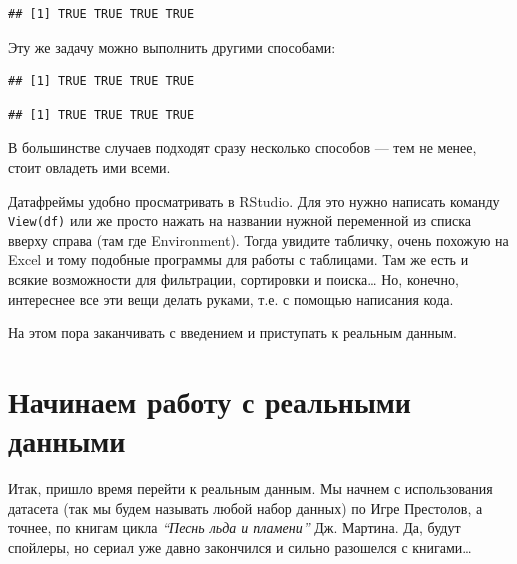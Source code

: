 \documentclass[]{book}
\newenvironment{Shaded}{\begin{snugshade}}{\end{snugshade}}
\newcommand{\KeywordTok}[1]{\textcolor[rgb]{0.13,0.29,0.53}{\textbf{#1}}}
\newcommand{\NormalTok}[1]{#1}
\newcommand{\OperatorTok}[1]{\textcolor[rgb]{0.81,0.36,0.00}{\textbf{#1}}}
\newcommand{\StringTok}[1]{\textcolor[rgb]{0.31,0.60,0.02}{#1}}
\begin{document}
\begin{verbatim}
## [1] TRUE TRUE TRUE TRUE
\end{verbatim}

Эту же задачу можно выполнить другими способами:

\begin{Shaded}
\end{Shaded}

\begin{verbatim}
## [1] TRUE TRUE TRUE TRUE
\end{verbatim}

\begin{Shaded}
\end{Shaded}

\begin{verbatim}
## [1] TRUE TRUE TRUE TRUE
\end{verbatim}

В большинстве случаев подходят сразу несколько способов --- тем не менее, стоит овладеть ими всеми.

Датафреймы удобно просматривать в RStudio. Для это нужно написать команду \texttt{View(df)} или же просто нажать на названии нужной переменной из списка вверху справа (там где Environment). Тогда увидите табличку, очень похожую на Excel и тому подобные программы для работы с таблицами. Там же есть и всякие возможности для фильтрации, сортировки и поиска\ldots{} Но, конечно, интереснее все эти вещи делать руками, т.е. с помощью написания кода.

На этом пора заканчивать с введением и приступать к реальным данным.

\hypertarget{real_data}{%
\section{Начинаем работу с реальными данными}\label{real_data}}

Итак, пришло время перейти к реальным данным. Мы начнем с использования датасета (так мы будем называть любой набор данных) по Игре Престолов, а точнее, по книгам цикла \emph{``Песнь льда и пламени''} Дж. Мартина. Да, будут спойлеры, но сериал уже давно закончился и сильно разошелся с книгами\ldots{}
\end{document}
